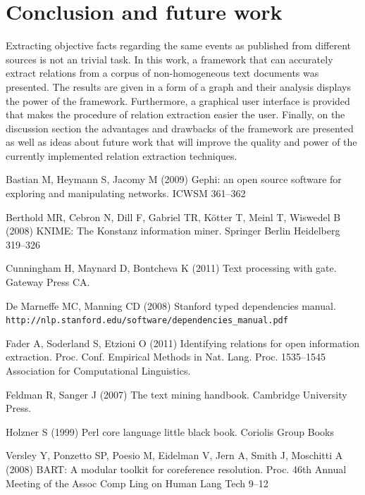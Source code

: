 \documentclass[]{article}
\begin{document}
\section{Conclusion and future work}
%
Extracting objective facts regarding the same events as published from different sources is not an trivial task. In this work, a framework that can accurately extract relations from a corpus of non-homogeneous text documents was presented. The results are given in a form of a graph and their analysis displays the power of the framework. Furthermore, a graphical user interface is provided that makes  the procedure of relation extraction easier the user. Finally, on the discussion section the advantages and drawbacks of the framework are presented as well as ideas about future work that will improve the quality and power of the currently implemented relation extraction techniques.
%
%
\begin{thebibliography}{99}
%

Bastian M, Heymann S, Jacomy M (2009)
Gephi: an open source software for exploring and manipulating networks.
ICWSM 361--362

Berthold MR, Cebron N, Dill F, Gabriel TR, Kötter T, Meinl T, Wiswedel B (2008)
KNIME: The Konstanz information miner.
Springer Berlin Heidelberg 319--326

Cunningham H, Maynard D, Bontcheva K (2011)
Text processing with gate.
Gateway Press CA.

De Marneffe MC, Manning CD (2008)
Stanford typed dependencies manual. \texttt{http://nlp.stanford.edu/software/dependencies\_manual.pdf}

Fader A, Soderland S, Etzioni O (2011) 
Identifying relations for open information extraction. 
Proc. Conf. Empirical Methods in Nat. Lang. Proc. 1535--1545
Association for Computational Linguistics.

Feldman R, Sanger J (2007) 
The text mining handbook.
Cambridge University Press.

Holzner S (1999)
Perl core language little black book. 
Coriolis Group Books

Versley Y, Ponzetto SP, Poesio M, Eidelman V, Jern A, Smith J, Moschitti A (2008)
BART: A modular toolkit for coreference resolution.
Proc. 46th Annual Meeting of the Assoc Comp Ling on Human Lang Tech 9--12

\end{thebibliography}
\end{document}
